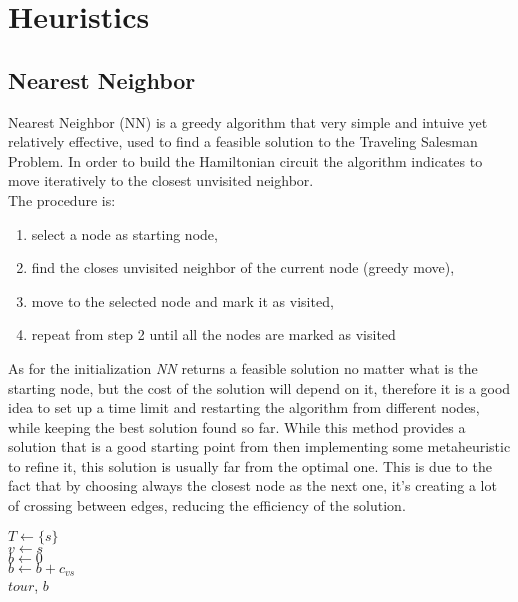 \chapter{Heuristics}

\section{Nearest Neighbor}

Nearest Neighbor (NN) is a greedy algorithm that very simple and intuive yet relatively effective, used to find a feasible solution to the Traveling Salesman Problem.
In order to build the Hamiltonian circuit the algorithm indicates to move iteratively to the closest unvisited neighbor.\\
The procedure is:

\begin{enumerate}
    \item select a node as starting node,
    \item find the closes unvisited neighbor of the current node (greedy move),
    \item move to the selected node and mark it as visited,
    \item repeat from step 2 until all the nodes are marked as visited
\end{enumerate}

As for the initialization \textit{NN} returns a feasible solution no matter what is the starting node, but the cost of the solution will 
depend on it, therefore it is a good idea to set up a time limit and restarting the algorithm from different nodes, while keeping the
best solution found so far.
While this method provides a solution that is a good starting point from then implementing some metaheuristic to refine it, this solution
is usually far from the optimal one. This is due to the fact that by choosing always the closest node as the next one, it's creating a
lot of crossing between edges, reducing the efficiency of the solution.
\\

\begin{algorithm}[H]
    \BlankLine
    $T \gets \{s\}$\\
    $v \gets s$\\
    $b \gets 0$\\
    $b \gets b + c_{vs}$\\
    \Return $tour$, $b$\\
\end{algorithm}


